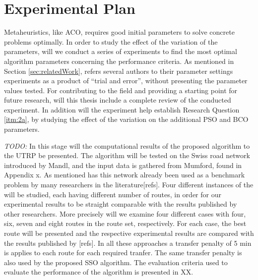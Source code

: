 \section{Experimental Plan}
\label{sec:expPlan}

Metaheuristics, like ACO, requires good initial parameters to solve concrete problems optimally. In order to study the effect of the variation of the parameters, will we conduct a series of experiments to find the most optimal algorithm parameters concerning the performance criteria. As mentioned in Section \vref{sec:relatedWork}, refers several authors to their parameter settings experiments as a product of ``trial and error'', without presenting the parameter values tested. For contributing to the field and providing a starting point for future research, will this thesis include a complete review of the conducted experiment. In addition will the experiment help establish Research Question \vref{itm:2a}, by studying the effect of the variation on the additional PSO and BCO parameters.  





\emph{\color{blue}TODO:} 
In this stage will the computational results of the proposed algorithm to the UTRP be presented. The algorithm will be tested on the Swiss road network introduced by Mandl, and the input data is gathered from Mumford, found in Appendix x. As mentioned has this network already been used as a benchmark problem by many researchers in the literature[refs]. Four different instances of the will be studied, each having different number of routes, in order for our experimental results to be straight comparable with the results published by other researchers. More precisely will we examine four different cases with four, six, seven and eight routes in the route set, respectively. For each case, the best route will be presented and the respective experimental results are compared with the results published by [refs]. In all these approaches a transfer penalty of 5 min is applies to each route for each required tranfer. The same transfer penalty is also used by the proposed SSO algorithm. The evaluation criteria used to evaluate the performance of the algorithm is presented in XX. 

